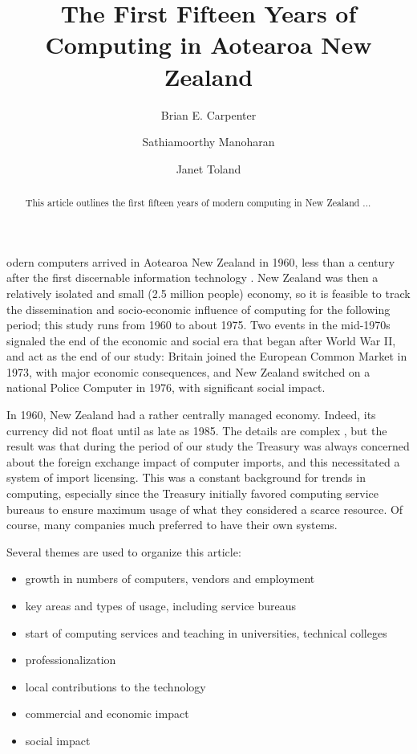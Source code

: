 \documentclass{IEEEcsmag}
\begin{document}

\title{The First Fifteen Years of Computing in Aotearoa New Zealand}

\author{Brian E. Carpenter}

\author{Sathiamoorthy Manoharan}

\author{Janet Toland}



\begin{abstract}This article outlines the first fifteen years of modern computing in New Zealand ... 
\end{abstract}

\maketitle


odern computers arrived in Aotearoa New Zealand in 1960, less than a century after the first discernable information technology \cite{pioneers}. New Zealand was then a relatively isolated and small (2.5 million people) economy, so it is feasible to track the dissemination and socio-economic influence of computing for the following period; this study runs from 1960 to about 1975. Two events in the mid-1970s signaled the end of the economic and social era that began after World War II, and act as the end of our study: Britain joined the European Common Market in 1973, with major economic consequences, and New Zealand switched on a national Police Computer in 1976, with significant social impact.

In 1960, New Zealand had a rather centrally managed economy. Indeed, its currency did not float until as late as 1985. The details are complex \cite{Sullivan2013}, but the result was that during the period of our study the Treasury was always concerned about the foreign exchange impact of computer imports, and this necessitated a system of import licensing. This was a constant background for trends in computing, especially since the Treasury initially favored computing service bureaus to ensure maximum usage of what they considered a scarce resource. Of course, many companies much preferred to have their own systems.

Several themes are used to organize this article:

\begin{itemize}
\item growth in numbers of computers, vendors and employment
\item key areas  and types of usage, including service bureaus
\item start of computing services and teaching in universities, technical colleges
\item professionalization
\item local contributions to the technology
\item commercial and economic impact
\item social impact
\end{itemize}
\end{document}
